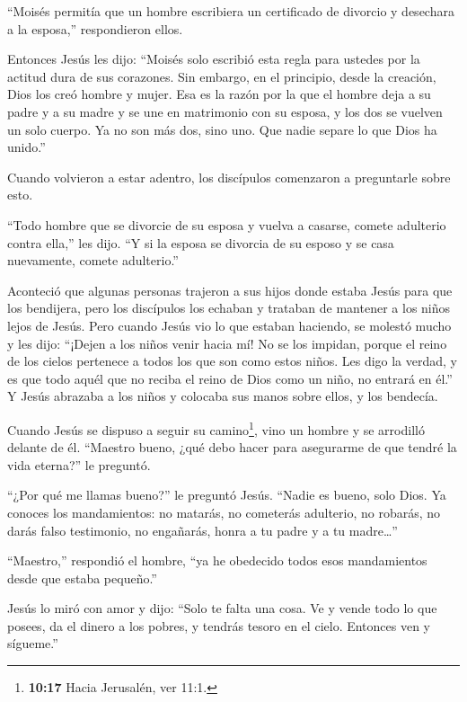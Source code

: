  ``Moisés permitía que un hombre escribiera un certificado
de divorcio y desechara a la esposa,'' respondieron ellos.

 Entonces Jesús les dijo: ``Moisés solo escribió esta regla
para ustedes por la actitud dura de sus corazones.  Sin
embargo, en el principio, desde la creación, Dios los creó hombre y
mujer.  Esa es la razón por la que el hombre deja a su padre
y a su madre y se une en matrimonio con su esposa,  y los
dos se vuelven un solo cuerpo. Ya no son más dos, sino uno. 
Que nadie separe lo que Dios ha unido.''

 Cuando volvieron a estar adentro, los discípulos
comenzaron a preguntarle sobre esto.

 ``Todo hombre que se divorcie de su esposa y vuelva a
casarse, comete adulterio contra ella,'' les dijo.  ``Y si
la esposa se divorcia de su esposo y se casa nuevamente, comete
adulterio.''

 Aconteció que algunas personas trajeron a sus hijos donde
estaba Jesús para que los bendijera, pero los discípulos los echaban y
trataban de mantener a los niños lejos de Jesús.  Pero
cuando Jesús vio lo que estaban haciendo, se molestó mucho y les dijo:
``¡Dejen a los niños venir hacia mí! No se los impidan, porque el reino
de los cielos pertenece a todos los que son como estos niños.
 Les digo la verdad, y es que todo aquél que no reciba el
reino de Dios como un niño, no entrará en él.''  Y Jesús
abrazaba a los niños y colocaba sus manos sobre ellos, y los bendecía.

 Cuando Jesús se dispuso a seguir su camino\footnote{\textbf{10:17}
  Hacia Jerusalén, ver 11:1.}, vino un hombre y se arrodilló delante de
él. ``Maestro bueno, ¿qué debo hacer para asegurarme de que tendré la
vida eterna?'' le preguntó.

 ``¿Por qué me llamas bueno?'' le preguntó Jesús. ``Nadie
es bueno, solo Dios.  Ya conoces los mandamientos: no
matarás, no cometerás adulterio, no robarás, no darás falso testimonio,
no engañarás, honra a tu padre y a tu madre\ldots{}''

 ``Maestro,'' respondió el hombre, ``ya he obedecido todos
esos mandamientos desde que estaba pequeño.''

 Jesús lo miró con amor y dijo: ``Solo te falta una cosa.
Ve y vende todo lo que posees, da el dinero a los pobres, y tendrás
tesoro en el cielo. Entonces ven y sígueme.''

